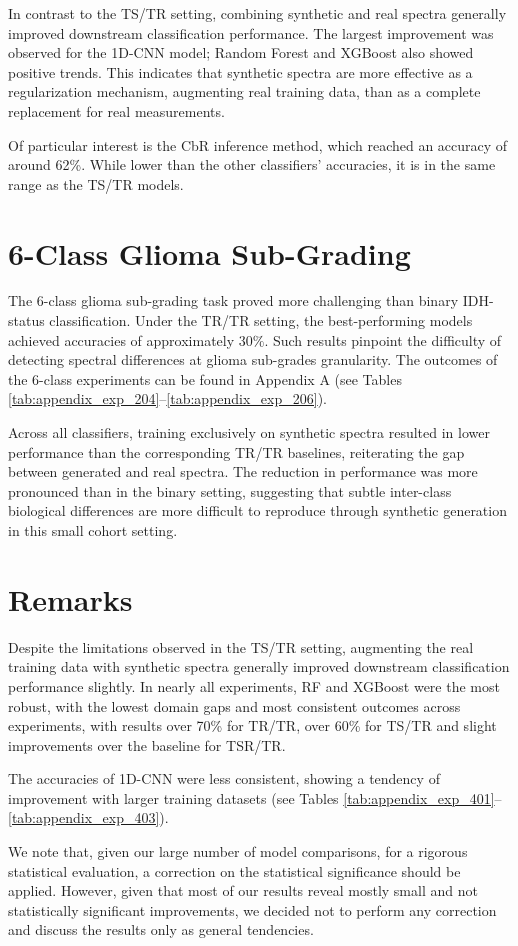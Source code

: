 In contrast to the TS/TR setting, combining synthetic and real spectra generally improved downstream classification performance. The largest improvement was observed for the 1D-CNN model; Random Forest and XGBoost also showed positive trends. This indicates that synthetic spectra are more effective as a regularization mechanism, augmenting real training data, than as a complete replacement for real measurements.

Of particular interest is the CbR inference method, which reached an accuracy of around 62\%. While lower than the other classifiers' accuracies, it is in the same range as the TS/TR models.

\section{6-Class Glioma Sub-Grading}
\label{sec:results_6class}


The 6-class glioma sub-grading task proved more challenging than binary IDH-status classification. Under the TR/TR setting, the best-performing models achieved accuracies of approximately $30\%$. Such results pinpoint the difficulty of detecting spectral differences at glioma sub-grades granularity. The outcomes of the 6-class experiments can be found in Appendix A (see Tables \ref{tab:appendix_exp_204}--\ref{tab:appendix_exp_206}).

Across all classifiers, training exclusively on synthetic spectra resulted in lower performance than the corresponding TR/TR baselines, reiterating the gap between generated and real spectra. The reduction in performance was more pronounced than in the binary setting, suggesting that subtle inter-class biological differences are more difficult to reproduce through synthetic generation in this small cohort setting.

\section{Remarks}
Despite the limitations observed in the TS/TR setting, augmenting the real training data with synthetic spectra generally improved downstream classification performance slightly. In nearly all experiments, RF and XGBoost were the most robust, with the lowest domain gaps and most consistent outcomes across experiments, with results over 70\% for TR/TR, over 60\% for TS/TR and slight improvements over the baseline for TSR/TR.

The accuracies of 1D-CNN were less consistent, showing a tendency of improvement with larger training datasets (see Tables \ref{tab:appendix_exp_401}--\ref{tab:appendix_exp_403}).

We note that, given our large number of model comparisons, for a rigorous statistical evaluation, a correction on the statistical significance should be applied. However, given that most of our results reveal mostly small and not statistically significant improvements, we decided not to perform any correction and discuss the results only as general tendencies.
